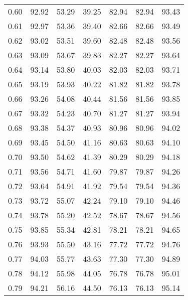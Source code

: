\begin{tabular}{|c|c|c|c|c|c|c|}
      0.60 &     92.92 &     53.29 &      39.25 &   82.94 &      82.94 &         93.43 \\
      0.61 &     92.97 &     53.36 &      39.40 &   82.66 &      82.66 &         93.49 \\
      0.62 &     93.02 &     53.51 &      39.60 &   82.48 &      82.48 &         93.56 \\
      0.63 &     93.09 &     53.67 &      39.83 &   82.27 &      82.27 &         93.64 \\
      0.64 &     93.14 &     53.80 &      40.03 &   82.03 &      82.03 &         93.71 \\
      0.65 &     93.19 &     53.93 &      40.22 &   81.82 &      81.82 &         93.78 \\
      0.66 &     93.26 &     54.08 &      40.44 &   81.56 &      81.56 &         93.85 \\
      0.67 &     93.32 &     54.23 &      40.70 &   81.27 &      81.27 &         93.94 \\
      0.68 &     93.38 &     54.37 &      40.93 &   80.96 &      80.96 &         94.02 \\
      0.69 &     93.45 &     54.50 &      41.16 &   80.63 &      80.63 &         94.10 \\
      0.70 &     93.50 &     54.62 &      41.39 &   80.29 &      80.29 &         94.18 \\
      0.71 &     93.56 &     54.71 &      41.60 &   79.87 &      79.87 &         94.26 \\
      0.72 &     93.64 &     54.91 &      41.92 &   79.54 &      79.54 &         94.36 \\
      0.73 &     93.72 &     55.07 &      42.24 &   79.10 &      79.10 &         94.46 \\
      0.74 &     93.78 &     55.20 &      42.52 &   78.67 &      78.67 &         94.56 \\
      0.75 &     93.85 &     55.34 &      42.81 &   78.21 &      78.21 &         94.65 \\
      0.76 &     93.93 &     55.50 &      43.16 &   77.72 &      77.72 &         94.76 \\
      0.77 &     94.03 &     55.77 &      43.63 &   77.30 &      77.30 &         94.89 \\
      0.78 &     94.12 &     55.98 &      44.05 &   76.78 &      76.78 &         95.01 \\
      0.79 &     94.21 &     56.16 &      44.50 &   76.13 &      76.13 &         95.14 \\

\end{tabular}

